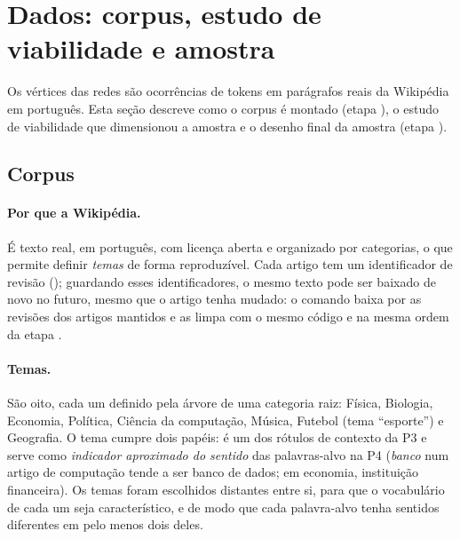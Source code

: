 \section{Dados: corpus, estudo de viabilidade e amostra}\label{sec:dados}

Os vértices das redes são ocorrências de tokens em parágrafos reais da Wikipédia em português.
Esta seção descreve como o corpus é montado (etapa ), o estudo de viabilidade que
dimensionou a amostra e o desenho final da amostra (etapa ).

\subsection{Corpus}\label{sec:corpus}

\paragraph{Por que a Wikipédia.} É texto real, em português, com licença aberta e
organizado por categorias, o que permite definir \emph{temas} de forma reproduzível. Cada
artigo tem um identificador de revisão (); guardando esses identificadores, o mesmo
texto pode ser baixado de novo no futuro, mesmo que o artigo tenha mudado: o comando
 baixa por  as revisões dos artigos mantidos e as limpa com o
mesmo código e na mesma ordem da etapa .

\paragraph{Temas.} São oito, cada um definido pela árvore de uma categoria raiz: Física,
Biologia, Economia, Política, Ciência da computação, Música, Futebol (tema ``esporte'') e
Geografia. O tema cumpre dois papéis: é um dos rótulos de contexto da P3 e serve como
\emph{indicador aproximado do sentido} das palavras-alvo na P4 (\emph{banco} num artigo de
computação tende a ser banco de dados; em economia, instituição financeira). Os temas foram
escolhidos distantes entre si, para que o vocabulário de cada um seja característico, e de
modo que cada palavra-alvo tenha sentidos diferentes em pelo menos dois deles.

